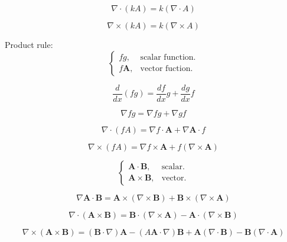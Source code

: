 \begin{equation}
\nabla{} \cdot (kA) = k(\nabla{} \cdot A)
\end{equation}

\begin{equation}
\nabla \times (kA) = k(\nabla \times A)
\end{equation}

Product rule: \begin{equation}
\begin{cases}
	fg, & \text{scalar function}.\\
	f\mathbf{A}, & \text{vector fuction}.
\end{cases}
\end{equation}

\begin{equation}
\frac{d}{dx}(fg) = \frac{df}{dx}g + \frac{dg}{dx}f
\end{equation}

\begin{equation}
\nabla{fg} = \nabla{f}g + \nabla{g}f
\end{equation}

\begin{equation}
\nabla{} \cdot (fA) = \nabla{f} \cdot \mathbf{A} + \nabla{\mathbf{A}} \cdot f 
\end{equation}

\begin{equation}
\nabla \times (fA) = \nabla{f} \times \mathbf{A} + f (\nabla \times \mathbf{A})
\end{equation}

\begin{equation}
\begin{cases}
	\mathbf{A \cdot B}, & \text{scalar}.\\
	\mathbf{A  \times  B}, & \text{vector}.
\end{cases}
\end{equation}

\begin{equation}
\nabla{\mathbf{A} \cdot \mathbf{B}} = \mathbf{A} \times (\nabla \times \mathbf{B}) +\mathbf{ B} \times (\nabla \times \mathbf{A})
\end{equation}

\begin{equation}
\nabla{} \cdot (\mathbf{A }\times \mathbf{B}) = \mathbf{B} \cdot (\nabla \times \mathbf{A}) - \mathbf{A} \cdot (\nabla \times \mathbf{B})
\end{equation}

\begin{equation}
\nabla \times(\mathbf{A} \times \mathbf{B}) = (\mathbf{B} \cdot \nabla{})\mathbf{A}-(A\mathbf{A} \cdot \nabla{})\mathbf{B} + \mathbf{A}(\nabla{} \cdot  \mathbf{B}) - \mathbf{B}(\nabla{} \cdot  \mathbf{A})
\end{equation}

